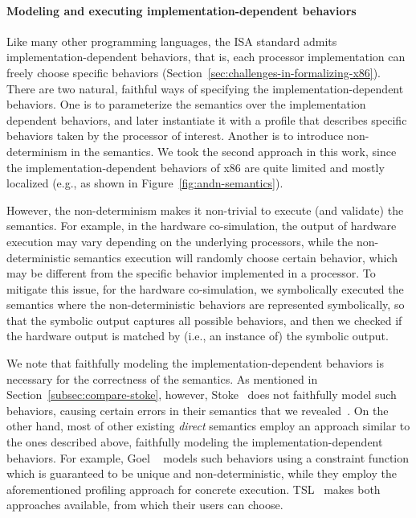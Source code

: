 \paragraph{Modeling and executing implementation-dependent behaviors}

Like many other programming languages, the \ISA ISA standard admits implementation-dependent behaviors, that is, each processor implementation can freely choose specific behaviors (Section~\ref{sec:challenges-in-formalizing-x86}).
There are two natural, faithful ways of specifying the implementation-dependent behaviors.
One is to parameterize the semantics over the implementation dependent behaviors, and later instantiate it with a profile that describes specific behaviors taken by the processor of interest.
Another is to introduce non-determinism in the semantics.
We took the second approach in this work, since the implementation-dependent behaviors of x86 are quite limited and mostly localized (e.g., as shown in Figure~\ref{fig:andn-semantics}).

However, the non-determinism makes it non-trivial to execute (and validate) the semantics.
For example, in the hardware co-simulation, the output of hardware execution may vary depending on the underlying processors, while the non-deterministic semantics execution will randomly choose certain behavior, which may be different from the specific behavior implemented in a processor.
To mitigate this issue, for the hardware co-simulation, we symbolically executed the semantics where the non-deterministic behaviors are represented symbolically, so that the symbolic output captures all possible behaviors, and then we checked if the hardware output is matched by (i.e., an instance of) the symbolic output. 

We note that faithfully modeling the implementation-dependent behaviors is necessary for the correctness of the semantics.
As mentioned in Section~\ref{subsec:compare-stoke}, however, Stoke~\cite{Stoke2013} does not faithfully model such behaviors, causing certain errors in their semantics that we revealed~\cite{BugStoke986}.
On the other hand, most of other existing \emph{direct} \ISA semantics employ an approach similar to the ones described above, faithfully modeling the implementation-dependent behaviors.
For example, Goel \etal~\cite{Goel:ProCoS17} models such behaviors using a constraint function which is guaranteed to be unique and non-deterministic, while they employ the aforementioned profiling approach for concrete execution.
TSL~\cite{TSL:TOPLAS13} makes both approaches available, from which their users can choose.

